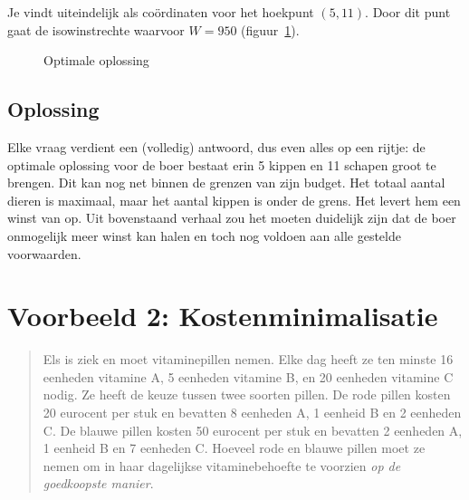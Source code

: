 Je vindt uiteindelijk als co\"{o}rdinaten voor het hoekpunt $(5,
11)$. Door dit punt gaat de isowinstrechte waarvoor $W= 950$ (figuur~\ref{fig:maxwinstrechte}).
\begin{figure}[htbp]
    \centering
{}
     \caption{Optimale oplossing}
    \label{fig:maxwinstrechte}
\end{figure}




\subsection{Oplossing}
Elke vraag verdient een (volledig) antwoord, dus even alles op
een rijtje: de optimale oplossing voor de boer bestaat erin 5 kippen en 11
schapen groot te brengen. Dit kan nog net binnen de grenzen van
zijn budget. Het totaal aantal dieren is maximaal, maar het aantal kippen is onder de grens.
Het levert hem een winst van  op. Uit
bovenstaand verhaal zou het moeten duidelijk zijn dat de boer
onmogelijk meer winst kan halen en toch nog voldoen aan alle
gestelde voorwaarden.





\newpage
\section{Voorbeeld 2: Kostenminimalisatie}\label{sec.minprob}

\begin{quote}
    Els is ziek en moet vitaminepillen nemen. Elke dag heeft ze ten minste
    16 eenheden vitamine A, 5 eenheden vitamine B, en 20 eenheden
    vitamine C nodig. Ze heeft de keuze tussen twee soorten pillen.
    De rode pillen kosten 20 eurocent per stuk en bevatten 8 eenheden
    A, 1 eenheid B en 2 eenheden C. De blauwe pillen kosten 50 eurocent
    per stuk en bevatten 2 eenheden A, 1 eenheid B en 7 eenheden
    C. Hoeveel rode en blauwe pillen moet ze nemen om in haar dagelijkse
    vitaminebehoefte te voorzien \emph{op de goedkoopste manier}.
\end{quote}



